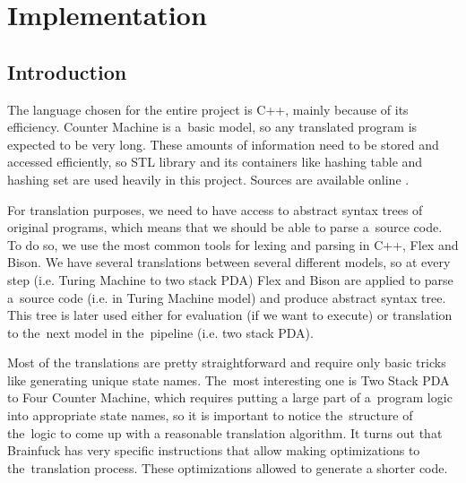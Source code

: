 \documentclass[english,shortabstract,mgr]{iithesis}
\begin{document}
\chapter{Implementation}

\section{Introduction}

The language chosen for the entire project is C++, mainly because of its efficiency. Counter Machine
is a~basic model, so any translated program is expected to be very long. These amounts of information
need to be stored and accessed efficiently, so STL library and its containers like hashing table
and hashing set are used heavily in this project. Sources are available online \cite{github}.

For translation purposes, we need to have access to abstract syntax trees of original programs, which
means that we should be able to parse a~source code. To do so, we use the most common tools
for lexing and parsing in C++, Flex and Bison. We have several translations
between several different models, so at every step (i.e. Turing Machine to two stack PDA) Flex and Bison
are applied to parse a~source code (i.e. in Turing Machine model) and produce abstract syntax tree.
This tree is later used either for evaluation (if we want to execute) or translation to the~next
model in the~pipeline (i.e. two stack PDA).

Most of the translations are pretty straightforward and require only basic tricks like
generating unique state names. The~most interesting one is Two Stack PDA to Four Counter Machine,
which requires putting a large part of a~program logic into appropriate state names, so it is important
to notice the~structure of the~logic to come up with a reasonable translation algorithm.
It turns out that Brainfuck has very specific instructions that allow making optimizations
to the~translation process. These optimizations allowed to generate a shorter
code.
\end{document}
